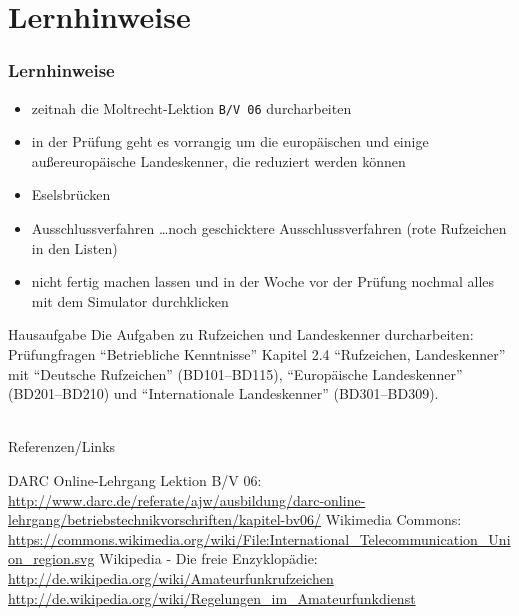 \section{Lernhinweise}

\begin{frame}
    \frametitle{Lernhinweise}

    \begin{itemize}
        \item zeitnah die Moltrecht-Lektion \texttt{B/V 06} durcharbeiten
        \item in der Prüfung geht es vorrangig um die europäischen und einige
              außereuropäische Landeskenner, die reduziert werden können
        \item Eselsbrücken
        \item Ausschlussverfahren
              \ldots noch geschicktere Ausschlussverfahren (rote Rufzeichen in den Listen)
        \item nicht fertig machen lassen und in der Woche vor der Prüfung
              nochmal alles mit dem Simulator durchklicken
    \end{itemize}

\end{frame}

\begin{frame}
  \begin{alertblock}{Hausaufgabe}
    Die Aufgaben zu Rufzeichen und Landeskenner durcharbeiten: Prüfungfragen ``Betriebliche Kenntnisse'' Kapitel 2.4 ``Rufzeichen, Landeskenner'' mit ``Deutsche Rufzeichen'' (BD101--BD115), ``Europäische Landeskenner'' (BD201--BD210) und ``Internationale Landeskenner'' (BD301--BD309).
  \end{alertblock}
\end{frame}

\renewcommand{\refname}{Referenzen}

\hypertarget{refs}{}
\textcolor{white}{} \\ %
\Large Referenzen/Links
\footnotesize

\begin{thebibliography}{}
      DARC Online-Lehrgang Lektion B/V 06: \\
                    \url{http://www.darc.de/referate/ajw/ausbildung/darc-online-lehrgang/betriebstechnikvorschriften/kapitel-bv06/}
        Wikimedia Commons: \\
                    \url{https://commons.wikimedia.org/wiki/File:International_Telecommunication_Union_region.svg}
        Wikipedia - Die freie Enzyklopädie: \\
                    \url{http://de.wikipedia.org/wiki/Amateurfunkrufzeichen} \\
                    \url{http://de.wikipedia.org/wiki/Regelungen_im_Amateurfunkdienst}
\end{thebibliography}


